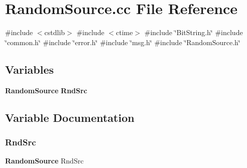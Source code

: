 \section{Random\+Source.\+cc File Reference}
\label{RandomSource_8cc}
{\ttfamily \#include $<$cstdlib$>$}\newline
{\ttfamily \#include $<$ctime$>$}\newline
{\ttfamily \#include \char`\"{}Bit\+String.\+h\char`\"{}}\newline
{\ttfamily \#include \char`\"{}common.\+h\char`\"{}}\newline
{\ttfamily \#include \char`\"{}error.\+h\char`\"{}}\newline
{\ttfamily \#include \char`\"{}msg.\+h\char`\"{}}\newline
{\ttfamily \#include \char`\"{}Random\+Source.\+h\char`\"{}}\newline
\subsection*{Variables}
\begin{DoxyCompactItemize}
\item 
\textbf{ Random\+Source} \textbf{ Rnd\+Src}
\end{DoxyCompactItemize}


\subsection{Variable Documentation}
\mbox{\label{RandomSource_8cc_a683edca1300d89e758d2347c2b85369e}} 
\subsubsection{Rnd\+Src}
{\footnotesize\ttfamily \textbf{ Random\+Source} Rnd\+Src}

